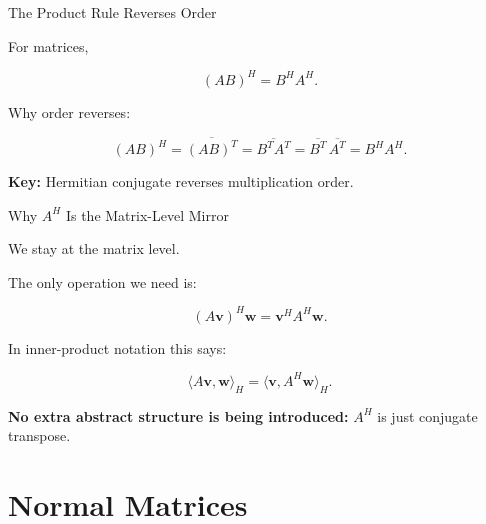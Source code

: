 \documentclass[10pt]{beamer}
\theoremstyle{definition}
\newcommand{\x}[1]{\alert{\textbf{#1}}}
\begin{document}
\begin{frame}{The Product Rule Reverses Order}

For matrices,

$$
(AB)^H=B^HA^H.
$$

\vfill\pause

Why order reverses:

$$
(AB)^H
=\overline{(AB)^T}
=\overline{B^TA^T}
=\overline{B^T}\,\overline{A^T}
=B^HA^H.
$$

\vfill

\x{Key:} Hermitian conjugate reverses multiplication order.

\end{frame}


\begin{frame}{Why $A^H$ Is the Matrix-Level Mirror}

We stay at the matrix level.

\vfill

The only operation we need is:

$$
(A\mathbf{v})^H\mathbf{w}
=\mathbf{v}^HA^H\mathbf{w}.
$$

\vfill\pause

In inner-product notation this says:

$$
\langle A\mathbf{v},\mathbf{w}\rangle_H
=
\langle \mathbf{v},A^H\mathbf{w}\rangle_H.
$$

\vfill

\x{No extra abstract structure is being introduced:} $A^H$ is just conjugate transpose.

\end{frame}


\section{Normal Matrices}
\end{document}
